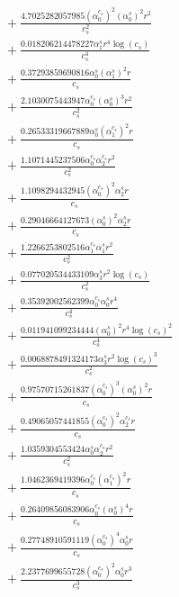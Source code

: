 \documentclass[10pt]{article}
\begin{document}
\begin{align*}
&{}  + \frac{4.7025282057985 \left(\alpha_{0}^{c_s}\right)^{2} \left(\alpha_{0}^s\right)^{2} r^{2}}{c_{s}^{2}} \\
&{}  + \frac{0.018206214478227 \alpha_{1}^s r^{4} \log{\left(c_{s} \right)}}{c_{s}^{4}} \\
&{}  + \frac{0.37293859690816 \alpha_{0}^s \left(\alpha_{1}^s\right)^{2} r}{c_{s}} \\
&{}  + \frac{2.1030075443947 \alpha_{0}^{c_s} \left(\alpha_{0}^s\right)^{3} r^{2}}{c_{s}^{2}} \\
&{}  + \frac{0.26533319667889 \alpha_{0}^s \left(\alpha_{1}^{c_s}\right)^{2} r}{c_{s}} \\
&{}  + \frac{1.1071445237506 \alpha_{0}^{c_s} \alpha_{2}^{c_s} r^{2}}{c_{s}^{2}} \\
&{}  + \frac{1.1098294432945 \left(\alpha_{0}^{c_s}\right)^{2} \alpha_{2}^s r}{c_{s}} \\
&{}  + \frac{0.29046664127673 \left(\alpha_{0}^s\right)^{2} \alpha_{2}^s r}{c_{s}} \\
&{}  + \frac{1.2266253802516 \alpha_{1}^{c_s} \alpha_{1}^s r^{2}}{c_{s}^{2}} \\
&{}  + \frac{0.077020534433109 \alpha_{3}^s r^{2} \log{\left(c_{s} \right)}}{c_{s}^{2}} \\
&{}  + \frac{0.35392002562399 \alpha_{0}^{c_s} \alpha_{0}^s r^{4}}{c_{s}^{4}} \\
&{}  + \frac{0.011941099234444 \left(\alpha_{0}^s\right)^{2} r^{4} \log{\left(c_{s} \right)}^{2}}{c_{s}^{4}} \\
&{}  + \frac{0.0068878491324173 \alpha_{3}^s r^{2} \log{\left(c_{s} \right)}^{3}}{c_{s}^{2}} \\
&{}  + \frac{0.97570715261837 \left(\alpha_{0}^{c_s}\right)^{3} \left(\alpha_{0}^s\right)^{2} r}{c_{s}} \\
&{}  + \frac{0.49065057441855 \left(\alpha_{0}^{c_s}\right)^{2} \alpha_{2}^{c_s} r}{c_{s}} \\
&{}  + \frac{1.0359304553424 \alpha_{0}^s \alpha_{2}^{c_s} r^{2}}{c_{s}^{2}} \\
&{}  + \frac{1.0462369419396 \alpha_{0}^{c_s} \left(\alpha_{1}^{c_s}\right)^{2} r}{c_{s}} \\
&{}  + \frac{0.26409856083906 \alpha_{0}^{c_s} \left(\alpha_{0}^s\right)^{4} r}{c_{s}} \\
&{}  + \frac{0.27748910591119 \left(\alpha_{0}^{c_s}\right)^{4} \alpha_{0}^s r}{c_{s}} \\
&{}  + \frac{2.2377699655728 \left(\alpha_{0}^{c_s}\right)^{2} \alpha_{0}^s r^{3}}{c_{s}^{3}} \\

\end{align*}
\end{document}
